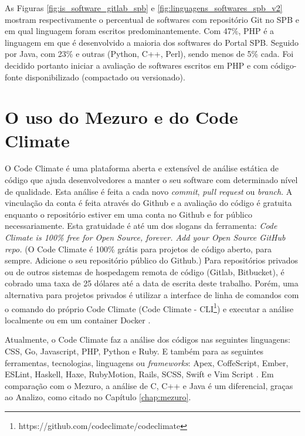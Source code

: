 \newpage

As Figuras \ref{fig:is_software_gitlab_spb} e \ref{fig:linguagens_softwares_spb_v2}
mostram respectivamente o percentual de softwares com repositório Git no SPB e
em qual linguagem foram escritos predominantemente. Com 47\%, PHP é a linguagem
em que é desenvolvido a maioria dos softwares do Portal SPB. Seguido por Java,
com 23\% e outras (Python, C++, Perl), sendo menos de 5\% cada. Foi decidido
portanto iniciar a avaliação de softwares escritos em PHP e com código-fonte
disponibilizado (compactado ou versionado).

\newpage

\section{O uso do Mezuro e do Code Climate}

O Code Climate é uma plataforma aberta e extensível de análise estática de código
que ajuda desenvolvedores a manter o seu software com determinado nível de
qualidade. Esta análise é feita a cada novo \textit{commit},
\textit{pull request} ou \textit{branch}. A vinculação da conta é feita através
do Github e a avaliação do código é gratuita enquanto o repositório estiver em
uma conta no Github e for público necessariamente. Esta gratuidade é até um dos
slogans da ferramenta: \textit{Code Climate is 100\% free for Open Source,
forever. Add your Open Source GitHub repo.} (O Code Climate é 100\% grátis para
projetos de código aberto, para sempre. Adicione o seu repositório público do
Github.) Para repositórios privados ou de outros sistemas de hospedagem remota de
código (Gitlab, Bitbucket), é cobrado uma taxa de 25 dólares até a data de
escrita deste trabalho. Porém, uma alternativa para projetos privados é utilizar
a interface de linha de comandos com o comando do próprio Code Climate (Code
Climate - CLI\footnote{https://github.com/codeclimate/codeclimate}) e executar a
análise localmente ou em um container Docker \cite{codeClimateDoc}.

Atualmente, o Code Climate faz a análise dos códigos nas seguintes linguagens:
CSS, Go, Javascript, PHP, Python e Ruby. E também para as seguintes ferramentas,
tecnologias, linguagens ou \textit{frameworks}: Apex, CoffeScript, Ember, ESLint,
Haskell, Haxe, RubyMotion, Rails, SCSS, Swift e Vim Script \cite{codeClimateDoc}.
Em comparação com o Mezuro, a análise de C, C++ e Java é um diferencial, graças
ao Analizo, como citado no Capítulo \ref{chap:mezuro}.


